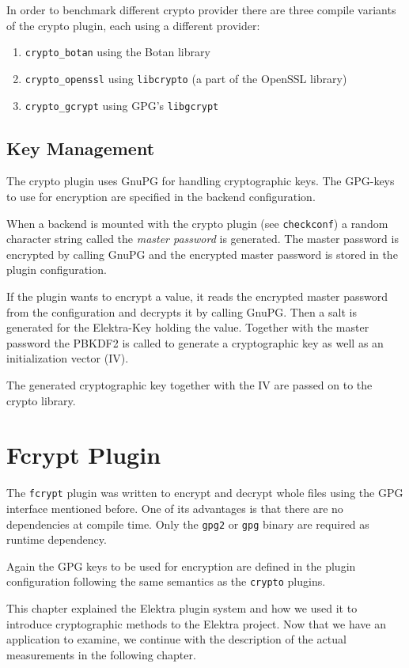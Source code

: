 In order to benchmark different crypto provider there are three compile
variants of the crypto plugin, each using a different provider:

\begin{enumerate}
\def\labelenumi{\arabic{enumi}.}
\tightlist
\item
  \texttt{crypto\_botan} using the Botan library
\item
  \texttt{crypto\_openssl} using \texttt{libcrypto} (a part of the
  OpenSSL library)
\item
  \texttt{crypto\_gcrypt} using GPG's \texttt{libgcrypt}
\end{enumerate}

\subsection{Key Management}\label{key-management}

The crypto plugin uses GnuPG for handling cryptographic keys. The
GPG-keys to use for encryption are specified in the backend
configuration.

When a backend is mounted with the crypto plugin (see
\texttt{checkconf}) a random character string called the \emph{master
password} is generated. The master password is encrypted by calling
GnuPG and the encrypted master password is stored in the plugin
configuration.

If the plugin wants to encrypt a value, it reads the encrypted master
password from the configuration and decrypts it by calling GnuPG. Then a
salt is generated for the Elektra-Key holding the value. Together with
the master password the PBKDF2 is called to generate a cryptographic key
as well as an initialization vector (IV).

The generated cryptographic key together with the IV are passed on to
the crypto library.

\section{Fcrypt Plugin}\label{fcrypt-plugin}

The \texttt{fcrypt} plugin was written to encrypt and decrypt whole files using the GPG interface mentioned before.
One of its advantages is that there are no dependencies at compile time.
Only the \texttt{gpg2} or \texttt{gpg} binary are required as runtime dependency.

Again the GPG keys to be used for encryption are defined in the plugin configuration following the same semantics as the \texttt{crypto} plugins.

This chapter explained the Elektra plugin system and how we used it to introduce cryptographic methods to the Elektra project.
Now that we have an application to examine, we continue with the description of the actual measurements in the following chapter.

